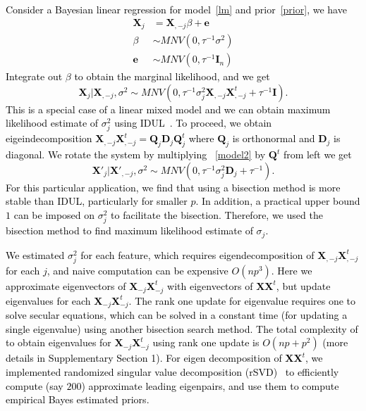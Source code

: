 \documentclass[12pt,Times]{article}
\def\cite{\citep}
\def\tcb{\textcolor{black}}
\def\D{{\mathbf{D}}}
\def\e{{\mathbf{e}}}
\def\X{{\mathbf{X}}}
\def\Q{{\mathbf{Q}}}
\def\D{{\mathbf{D}}}
\def\I{{\mathbf{I}}}
\begin{document}
\tcb{Consider a Bayesian linear regression for model~\eqref{lm} and prior~\eqref{prior}, we have 
\begin{equation}
\begin{aligned}\label{model2}
\X_j &= \X_{,-j} \beta + \e \\
    \beta &\sim MNV(0, \tau^{-1} \sigma^2) \\
    \e & \sim MNV(0, \tau^{-1} \I_n) 
\end{aligned}
\end{equation}
Integrate out $\beta$ to obtain the marginal likelihood, and we get 
\begin{equation}
\X_j|\X_{,-j}, \sigma^2 \sim MNV(0, \tau^{-1} \sigma_j^2 \X_{,-j}\X_{,-j}^t + \tau^{-1}\I).  
\end{equation}
This is a special case of a linear mixed model and we can obtain maximum likelihood estimate of $\sigma_j^2$ using IDUL~\cite{idul}. 
To proceed, we obtain eigeindecomposition $\X_{,-j}\X_{,-j}^t = \Q_j\D_j\Q_j^t$ where $\Q_j$ is orthonormal and $\D_j$ is diagonal. 
We rotate the system by multiplying ~\eqref{model2} by $\Q^t$ from left we get 
\begin{equation} \label{ebj}
\X'_j | \X'_{,-j}, \sigma^2 \sim MNV(0, \tau^{-1} \sigma_j^2 \D_j + \tau^{-1}).
\end{equation}
For this particular application, we find that using a bisection method is more stable than IDUL, particularly for smaller $p$.  In addition, a practical upper bound $1$ can be imposed on $\sigma_j^2$ to facilitate the bisection. Therefore, we used the bisection method to find maximum likelihood estimate of $\sigma_j$.
}

\tcb{We estimated $\sigma_j^2$ for each feature, which requires eigendecomposition of $\X_{,-j}\X_{,-j}^t$ for each $j$, and naive computation can be expensive $O(np^3)$. Here we approximate eigenvectors of  $\X_{-j}\X_{-j}^t$ with eigenvectors of  $\X\X^t$, but update eigenvalues for each $\X_{-j}\X_{-j}^t$.  The rank one update for eigenvalue requires one to solve secular equations, which can be solved in a constant time (for updating a single eigenvalue) using another bisection search method. The total complexity of to obtain eigenvalues for  $\X_{-j}\X_{-j}^t$ using rank one update is $O(np+p^2)$ (more details in Supplementary Section 1).  
For eigen decomposition of $\X\X^t$, we implemented randomized singular value decomposition (rSVD)~\cite{rsvd} to efficiently compute (say $200$) approximate leading eigenpairs, and use them to compute empirical Bayes estimated priors. }
\end{document}
